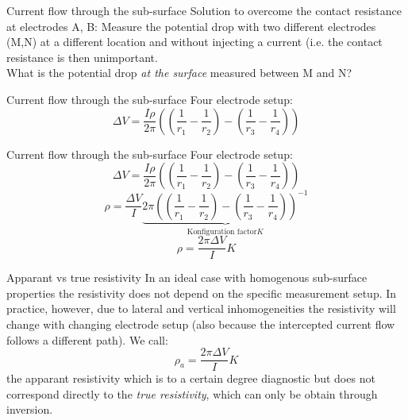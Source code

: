 \begin{frame}
  \begin{PointSix}{Current flow through the sub-surface}
   \small Solution to overcome the contact resistance at electrodes A, B: Measure the potential drop with two different electrodes (M,N) at a different location and without injecting a current (i.e. the contact resistance is then unimportant.
   \\
   \vspace{1cm}
   \small \alert{What is the potential drop \textit{at the surface} measured between M and N?}
  \end{PointSix}
\end{frame}


\begin{frame}
  \begin{PointSix}{Current flow through the sub-surface}
   Four electrode setup:
   $$
    \Delta V = \frac{I\rho}{2\pi}\left((\frac{1}{r_1}- \frac{1}{r_2})-(\frac{1}{r_3}-\frac{1}{r_4})\right)
   $$
  \end{PointSix}
\end{frame}

\begin{frame}
  \begin{PointSix}{Current flow through the sub-surface}
   \small Four electrode setup:
   $$
    \Delta V = \frac{I\rho}{2\pi}\left((\frac{1}{r_1}- \frac{1}{r_2})-(\frac{1}{r_3}-\frac{1}{r_4})\right)
   $$
   $$
   \rho = \frac{ \Delta V}{I}\underbrace{2\pi\left((\frac{1}{r_1}- \frac{1}{r_2})-(\frac{1}{r_3}-\frac{1}{r_4})\right)^{-1}}_{\text{Konfiguration factor} K}
  $$
  $$
    \boxed{\rho = \frac{2\pi \Delta V}{I} K}
  $$
  \end{PointSix}
\end{frame}
\begin{frame}
  \begin{PointSix}{Apparant vs true resistivity}
   \small In an ideal case with homogenous sub-surface properties the resistivity does not depend on the specific measurement setup. In practice, however, due to lateral and vertical inhomogeneities the resistivity will change with changing electrode setup (also because the intercepted current flow follows a different path). We call:
    $$
    \boxed{\rho_a = \frac{2\pi \Delta V}{I} K}
    $$
  the \alert{apparant resistivity} which is to a certain degree diagnostic but does not correspond directly to the \textit{true resistivity}, which can only be obtain through inversion. 
  \end{PointSix}
\end{frame}

